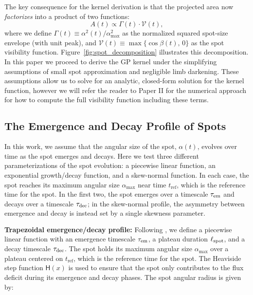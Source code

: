 \documentclass[preprint]{aastex702}
\begin{document}
The key consequence for the kernel derivation is that the projected area now \emph{factorizes} into a product of two functions:
\begin{equation}
    A(t) \propto \Gamma(t) \cdot \mathcal{V}(t),
\end{equation}
where we define $\Gamma(t) \equiv \alpha^2(t)/\alpha_{\max}^2$ as the normalized squared spot-size envelope (with unit peak), and $\mathcal{V}(t) \equiv \max\{\cos\beta(t),\, 0\}$ as the spot visibility function. Figure~\ref{fig:spot_decomposition} illustrates this decomposition. 
In this paper we proceed to derive the GP kernel under the simplifying assumptions of small spot approximation and negligible limb darkening. These assumptions allow us to solve for an analytic, closed-form solution for the kernel function, however we will refer the reader to Paper II for the numerical approach for how to compute the full visibility function including these terms.


\subsection{The Emergence and Decay Profile of Spots} \label{sec:spot_profile}

In this work, we assume that the angular size of the spot, $\alpha(t)$, evolves over time as the spot emerges and decays. Here we test three different parameterizations of the spot evolution: a piecewise linear function, an exponential growth/decay function, and a skew-normal function. In each case, the spot reaches its maximum angular size $\alpha_{\mathrm{max}}$ near time $t_{\mathrm{ref}}$, which is the reference time for the spot. In the first two, the spot emerges over a timescale $\tau_{\rm em}$ and decays over a timescale $\tau_{\rm dec}$; in the skew-normal profile, the asymmetry between emergence and decay is instead set by a single skewness parameter.

\textbf{Trapezoidal emergence/decay profile:} Following \citet{kipping_analytic_2012}, we define a piecewise linear function with an emergence timescale $\tau_{\rm em}$, a plateau duration $\ell_{\rm spot}$, and a decay timescale $\tau_{\rm dec}$. The spot holds its maximum angular size $\alpha_{\mathrm{max}}$ over a plateau centered on $t_{\mathrm{ref}}$, which is the reference time for the spot. The Heaviside step function $\mathsf{H}(x)$ is used to ensure that the spot only contributes to the flux deficit during its emergence and decay phases. The spot angular radius is given by:
\end{document}
